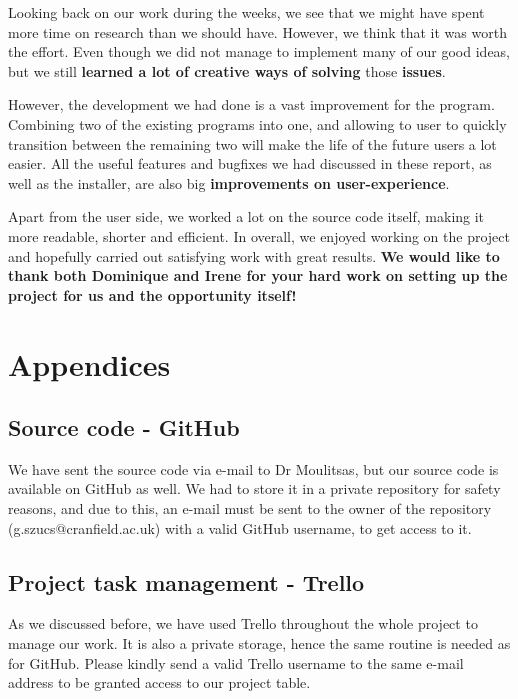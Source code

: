 \documentclass[a4paper, 11pt, article]{report}
\begin{document}
Looking back on our work during the weeks, we see that we might have spent more time on research than we should have. However, we think that it was worth the effort. Even though we did not manage to implement many of our good ideas, but we still \textbf{learned a lot of creative ways of solving} those \textbf{issues}.

However, the development we had done is a vast improvement for the program. Combining two of the existing programs into one, and allowing to user to quickly transition between the remaining two will make the life of the future users a lot easier. All the useful features and bugfixes we had discussed in these report, as well as the installer, are also big \textbf{improvements on user-experience}.

Apart from the user side, we worked a lot on the source code itself, making it more readable, shorter and efficient. In overall, we enjoyed working on the project and hopefully carried out satisfying work with great results. \textbf{We would like to thank both Dominique and Irene for your hard work on setting up the project for us and the opportunity itself!}


\chapter{Appendices}

\section{Source code - GitHub}

We have sent the source code via e-mail to Dr Moulitsas, but our source code is available on GitHub as well. We had to store it in a private repository for safety reasons, and due to this, an e-mail must be sent to the owner of the repository (g.szucs@cranfield.ac.uk) with a valid GitHub username, to get access to it. 

\section{Project task management - Trello}

As we discussed before, we have used Trello throughout the whole project to manage our work. It is also a private storage, hence the same routine is needed as for GitHub. Please kindly send a valid Trello username to the same e-mail address to be granted access to our project table. 
\end{document}
